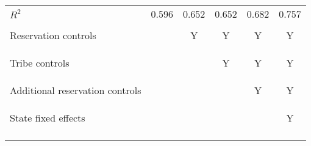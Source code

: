 \begin{center}
\begin{tabular}{lccccc}
\noalign{\smallskip}$ R^2$ & 0.596 & 0.652 & 0.652 & 0.682 & 0.757\\
 & \begin{footnotesize}\end{footnotesize} & \begin{footnotesize}\end{footnotesize} & \begin{footnotesize}\end{footnotesize} & \begin{footnotesize}\end{footnotesize} & \begin{footnotesize}\end{footnotesize}\\
\noalign{\smallskip}Reservation controls &  & Y & Y & Y & Y\\
Tribe controls & \begin{footnotesize}\end{footnotesize} & \begin{footnotesize}\end{footnotesize} & \begin{footnotesize}Y\end{footnotesize} & \begin{footnotesize}Y\end{footnotesize} & \begin{footnotesize}Y\end{footnotesize}\\
Additional reservation controls &  &  &  & Y & Y\\
State fixed effects & \begin{footnotesize}\end{footnotesize} & \begin{footnotesize}\end{footnotesize} & \begin{footnotesize}\end{footnotesize} & \begin{footnotesize}\end{footnotesize} & \begin{footnotesize}Y\end{footnotesize}\\
\noalign{\smallskip}\hline\end{tabular}\\
\end{center}
